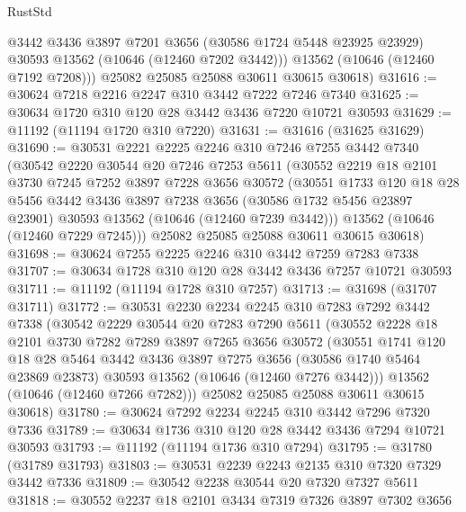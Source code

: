 \begin{lexlean}{RustStd}
\begin{coremodule}
          @3442
          @3436
          @3897
          @7201
          @3656
          (@30586 @1724 @5448 @23925 @23929)
          @30593
          @13562
          (@10646 (@12460 @7202 @3442)))
        @13562
        (@10646 (@12460 @7192 @7208)))
      @25082
      @25085
      @25088
      @30611
      @30615
      @30618)
@31616 := @30624 @7218 @2216 @2247 @310 @3442 @7222 @7246 @7340
@31625 := @30634 @1720 @310 @120 @28 @3442 @3436 @7220 @10721 @30593
@31629 := @11192 (@11194 @1720 @310 @7220)
@31631 := @31616 (@31625 @31629)
@31690 := @30531
    @2221
    @2225
    @2246
    @310
    @7246
    @7255
    @3442
    @7340
    (@30542
      @2220
      @30544
      @20
      @7246
      @7253
      @5611
      (@30552
        @2219
        @18
        @2101
        @3730
        @7245
        @7252
        @3897
        @7228
        @3656
        @30572
        (@30551
          @1733
          @120
          @18
          @28
          @5456
          @3442
          @3436
          @3897
          @7238
          @3656
          (@30586 @1732 @5456 @23897 @23901)
          @30593
          @13562
          (@10646 (@12460 @7239 @3442)))
        @13562
        (@10646 (@12460 @7229 @7245)))
      @25082
      @25085
      @25088
      @30611
      @30615
      @30618)
@31698 := @30624 @7255 @2225 @2246 @310 @3442 @7259 @7283 @7338
@31707 := @30634 @1728 @310 @120 @28 @3442 @3436 @7257 @10721 @30593
@31711 := @11192 (@11194 @1728 @310 @7257)
@31713 := @31698 (@31707 @31711)
@31772 := @30531
    @2230
    @2234
    @2245
    @310
    @7283
    @7292
    @3442
    @7338
    (@30542
      @2229
      @30544
      @20
      @7283
      @7290
      @5611
      (@30552
        @2228
        @18
        @2101
        @3730
        @7282
        @7289
        @3897
        @7265
        @3656
        @30572
        (@30551
          @1741
          @120
          @18
          @28
          @5464
          @3442
          @3436
          @3897
          @7275
          @3656
          (@30586 @1740 @5464 @23869 @23873)
          @30593
          @13562
          (@10646 (@12460 @7276 @3442)))
        @13562
        (@10646 (@12460 @7266 @7282)))
      @25082
      @25085
      @25088
      @30611
      @30615
      @30618)
@31780 := @30624 @7292 @2234 @2245 @310 @3442 @7296 @7320 @7336
@31789 := @30634 @1736 @310 @120 @28 @3442 @3436 @7294 @10721 @30593
@31793 := @11192 (@11194 @1736 @310 @7294)
@31795 := @31780 (@31789 @31793)
@31803 := @30531 @2239 @2243 @2135 @310 @7320 @7329 @3442 @7336
@31809 := @30542 @2238 @30544 @20 @7320 @7327 @5611
@31818 := @30552 @2237 @18 @2101 @3434 @7319 @7326 @3897 @7302 @3656

\end{coremodule}
\end{lexlean}
